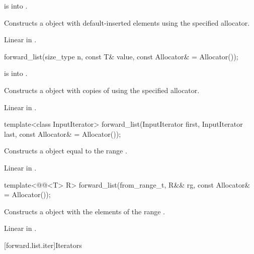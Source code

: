 \begin{itemdescr}
\pnum
\expects
{} is  into .

\pnum
\effects
Constructs a  object with 
default-inserted elements using the specified allocator.

\pnum
\complexity
Linear in .
\end{itemdescr}

%
\begin{itemdecl}
forward_list(size_type n, const T& value, const Allocator& = Allocator());
\end{itemdecl}

\begin{itemdescr}
\pnum
\expects
{} is  into .

\pnum
\effects
Constructs a  object with  copies of  using the specified allocator.

\pnum
\complexity
Linear in .
\end{itemdescr}

%
\begin{itemdecl}
template<class InputIterator>
  forward_list(InputIterator first, InputIterator last, const Allocator& = Allocator());
\end{itemdecl}

\begin{itemdescr}
\pnum
\effects
Constructs a  object equal to the range .

\pnum
\complexity
Linear in .
\end{itemdescr}

%
\begin{itemdecl}
template<@@<T> R>
  forward_list(from_range_t, R&& rg, const Allocator& = Allocator());
\end{itemdecl}

\begin{itemdescr}
\pnum
\effects
Constructs a  object
with the elements of the range .

\pnum
\complexity
Linear in .
\end{itemdescr}

[forward.list.iter]{Iterators}

